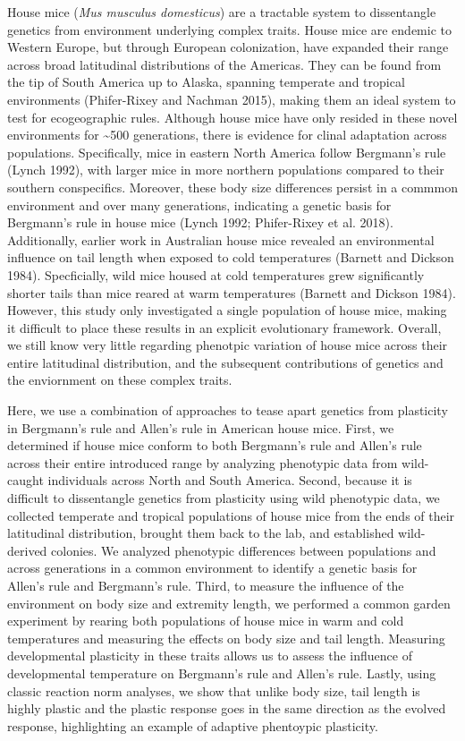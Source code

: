\documentclass[]{article}
\begin{document}
House mice (\emph{Mus musculus domesticus}) are a tractable system to
dissentangle genetics from environment underlying complex traits. House
mice are endemic to Western Europe, but through European colonization,
have expanded their range across broad latitudinal distributions of the
Americas. They can be found from the tip of South America up to Alaska,
spanning temperate and tropical environments (Phifer-Rixey and Nachman
2015), making them an ideal system to test for ecogeographic rules.
Although house mice have only resided in these novel environments for
\textasciitilde{}500 generations, there is evidence for clinal
adaptation across populations. Specifically, mice in eastern North
America follow Bergmann's rule (Lynch 1992), with larger mice in more
northern populations compared to their southern conspecifics. Moreover,
these body size differences persist in a commmon environment and over
many generations, indicating a genetic basis for Bergmann's rule in
house mice (Lynch 1992; Phifer-Rixey et al. 2018). Additionally, earlier
work in Australian house mice revealed an environmental influence on
tail length when exposed to cold temperatures (Barnett and Dickson
1984). Specficially, wild mice housed at cold temperatures grew
significantly shorter tails than mice reared at warm temperatures
(Barnett and Dickson 1984). However, this study only investigated a
single population of house mice, making it difficult to place these
results in an explicit evolutionary framework. Overall, we still know
very little regarding phenotpic variation of house mice across their
entire latitudinal distribution, and the subsequent contributions of
genetics and the enviornment on these complex traits.

Here, we use a combination of approaches to tease apart genetics from
plasticity in Bergmann's rule and Allen's rule in American house mice.
First, we determined if house mice conform to both Bergmann's rule and
Allen's rule across their entire introduced range by analyzing
phenotypic data from wild-caught individuals across North and South
America. Second, because it is difficult to dissentangle genetics from
plasticity using wild phenotypic data, we collected temperate and
tropical populations of house mice from the ends of their latitudinal
distribution, brought them back to the lab, and established wild-derived
colonies. We analyzed phenotypic differences between populations and
across generations in a common environment to identify a genetic basis
for Allen's rule and Bergmann's rule. Third, to measure the influence of
the environment on body size and extremity length, we performed a common
garden experiment by rearing both populations of house mice in warm and
cold temperatures and measuring the effects on body size and tail
length. Measuring developmental plasticity in these traits allows us to
assess the influence of developmental temperature on Bergmann's rule and
Allen's rule. Lastly, using classic reaction norm analyses, we show that
unlike body size, tail length is highly plastic and the plastic response
goes in the same direction as the evolved response, highlighting an
example of adaptive phentoypic plasticity.
\end{document}
